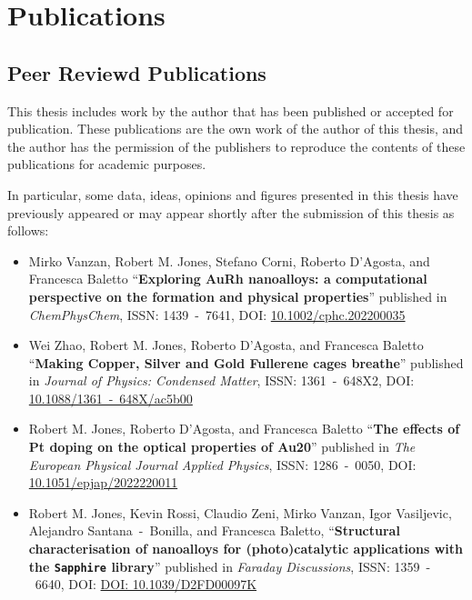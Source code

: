 \chapter*{Publications}

\section{Peer Reviewd Publications}

This thesis includes work by the author that has been published or accepted for publication. These publications are the own work of the author of this thesis, and the author has the permission of the publishers to reproduce the contents of these publications for academic purposes.

In particular, some data, ideas, opinions and figures presented in this thesis have previously appeared or may appear shortly after the submission of this thesis as follows:
\begin{itemize}
  
  \item \cite{Mirko} Mirko Vanzan, Robert M. Jones, Stefano Corni, Roberto D'Agosta, and Francesca Baletto ``\textbf{Exploring AuRh nanoalloys: a computational perspective on the formation and physical properties}'' published in \emph{ChemPhysChem}, ISSN: 1439~-~7641, DOI: \href{https://chemistry-europe.onlinelibrary.wiley.com/doi/10.1002/cphc.202200035}{10.1002/cphc.202200035}
  
  \item \cite{Wei} Wei Zhao, Robert M. Jones, Roberto D'Agosta, and Francesca Baletto ``\textbf{Making Copper, Silver and Gold Fullerene cages breathe}'' published in \emph{Journal of Physics: Condensed Matter}, ISSN: 1361~-~648X2, DOI: \href{https://iopscience.iop.org/article/10.1088/1361-648X/ac5b00}{10.1088/1361~-~648X/ac5b00}
  
  \item \cite{JonesAuPt} Robert M. Jones, Roberto D'Agosta, and Francesca Baletto ``\textbf{The effects of Pt doping on the optical properties of Au20}'' published in \emph{The European Physical Journal Applied Physics}, ISSN: 1286~-~0050, DOI: \href{https://www.epjap.org/component/article?access=doi&doi=10.1051/epjap/2022220011}{10.1051/epjap/2022220011}
  
  \item \cite{Sapphy} Robert M. Jones, Kevin Rossi, Claudio Zeni, Mirko Vanzan, Igor Vasiljevic, Alejandro
Santana~-~Bonilla, and Francesca Baletto, ``\textbf{Structural characterisation of nanoalloys for (photo)catalytic applications with the \texttt{Sapphire} library}'' published in \emph{Faraday Discussions}, ISSN: 1359~-~6640, DOI: \href{https://pubs.rsc.org/en/content/articlepdf/2022/FD/D2FD00097K?page=search}{DOI: 10.1039/D2FD00097K}
 

\end{itemize}

